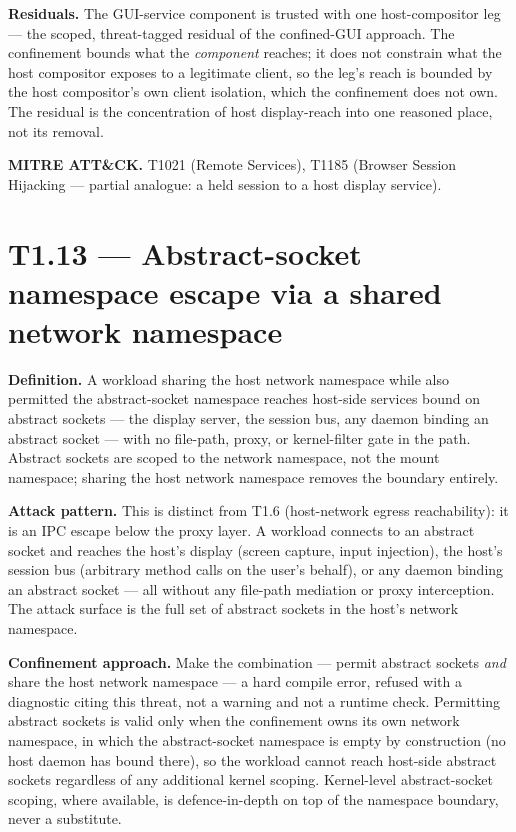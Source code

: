 \textbf{Residuals.} The GUI-service component is trusted with one
host-compositor leg --- the scoped, threat-tagged residual of the
confined-GUI approach. The confinement bounds what the \emph{component}
reaches; it does not constrain what the host compositor exposes to a
legitimate client, so the leg's reach is bounded by the host
compositor's own client isolation, which the confinement does not own.
The residual is the concentration of host display-reach into one
reasoned place, not its removal.

\textbf{MITRE ATT\&CK.} T1021 (Remote Services), T1185 (Browser Session
Hijacking --- partial analogue: a held session to a host display
service).

\hypertarget{t1.13-abstract-socket-namespace-escape-via-a-shared-network-namespace}{%
\section{T1.13 --- Abstract-socket namespace escape via a shared network
namespace}\label{t1.13-abstract-socket-namespace-escape-via-a-shared-network-namespace}}

\textbf{Definition.} A workload sharing the host network namespace while
also permitted the abstract-socket namespace reaches host-side services
bound on abstract sockets --- the display server, the session bus, any
daemon binding an abstract socket --- with no file-path, proxy, or
kernel-filter gate in the path. Abstract sockets are scoped to the
network namespace, not the mount namespace; sharing the host network
namespace removes the boundary entirely.

\textbf{Attack pattern.} This is distinct from T1.6 (host-network egress
reachability): it is an IPC escape below the proxy layer. A workload
connects to an abstract socket and reaches the host's display (screen
capture, input injection), the host's session bus (arbitrary method
calls on the user's behalf), or any daemon binding an abstract socket
--- all without any file-path mediation or proxy interception. The
attack surface is the full set of abstract sockets in the host's network
namespace.

\textbf{Confinement approach.} Make the combination --- permit abstract
sockets \emph{and} share the host network namespace --- a hard compile
error, refused with a diagnostic citing this threat, not a warning and
not a runtime check. Permitting abstract sockets is valid only when the
confinement owns its own network namespace, in which the abstract-socket
namespace is empty by construction (no host daemon has bound there), so
the workload cannot reach host-side abstract sockets regardless of any
additional kernel scoping. Kernel-level abstract-socket scoping, where
available, is defence-in-depth on top of the namespace boundary, never a
substitute.

